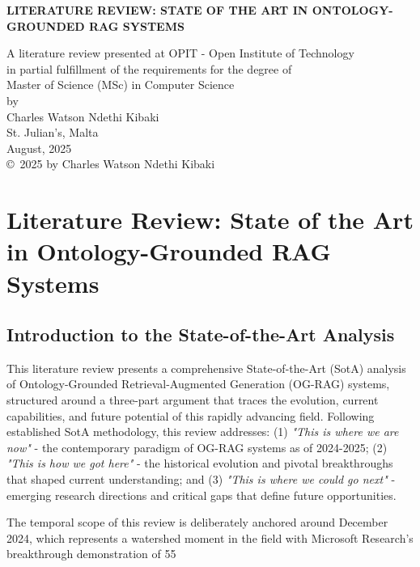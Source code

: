 \documentclass[12pt]{report}
\begin{document}
\begin{titlepage}
\centering
{\Large\bfseries LITERATURE REVIEW: STATE OF THE ART IN ONTOLOGY-GROUNDED RAG SYSTEMS \par}
\vfill
A literature review presented at OPIT - Open Institute of Technology\\
in partial fulfillment of the requirements for the degree of\\
Master of Science (MSc) in Computer Science\\
\vfill
by\\
Charles Watson Ndethi Kibaki\\
\vfill
St. Julian's, Malta\\
August, 2025\\
\vfill
\copyright~2025 by Charles Watson Ndethi Kibaki
\end{titlepage}

\tableofcontents
\newpage

\setcounter{page}{1}

\chapter{Literature Review: State of the Art in Ontology-Grounded RAG Systems}

\section{Introduction to the State-of-the-Art Analysis}

This literature review presents a comprehensive State-of-the-Art (SotA) analysis of Ontology-Grounded Retrieval-Augmented Generation (OG-RAG) systems, structured around a three-part argument that traces the evolution, current capabilities, and future potential of this rapidly advancing field. Following established SotA methodology, this review addresses: (1) \textit{"This is where we are now"} - the contemporary paradigm of OG-RAG systems as of 2024-2025; (2) \textit{"This is how we got here"} - the historical evolution and pivotal breakthroughs that shaped current understanding; and (3) \textit{"This is where we could go next"} - emerging research directions and critical gaps that define future opportunities.

The temporal scope of this review is deliberately anchored around December 2024, which represents a watershed moment in the field with Microsoft Research's breakthrough demonstration of 55%
\end{document}
